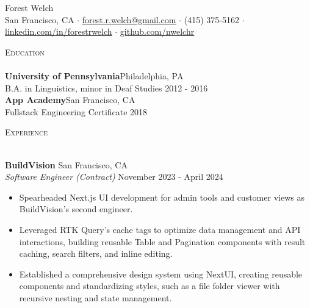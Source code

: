 \documentclass[a4paper]{article}
\newcommand{\header} [1] {
    {\hspace*{-18pt}\vspace*{3pt} \textcolor{deeppurple}{\textsc{#1}}}
    \vspace*{-12pt} \\
    \hspace*{-18pt} \textcolor{deeppurple}{\hrulefill} \\
}
\begin{document}
\vspace{-40pt}

\begin{center}
    {\fontsize{36}{36}\selectfont \textcolor{deeppurple}{Forest Welch}} \\ %
    \vspace{10pt} %
    \small San Francisco, CA $\cdot$ \href{mailto:forest.r.welch@gmail.com}{\underline{forest.r.welch@gmail.com}} $\cdot$ (415) 375-5162 $\cdot$ \href{https://linkedin.com/in/forestrwelch}{\underline{linkedin.com/in/forestrwelch}} $\cdot$ \href{https://github.com/nwelchr}{\underline{github.com/nwelchr}} %
\end{center}

\header{Education}
\textbf{University of Pennsylvania}\hfill Philadelphia, PA\\
B.A. in Linguistics, minor in Deaf Studies \hfill 2012 - 2016\\
\vspace{2mm}
\textbf{App Academy}\hfill San Francisco, CA\\
Fullstack Engineering Certificate \hfill 2018\\
\vspace{2mm}

\header{Experience}
\vspace{1mm}

\textbf{BuildVision} \hfill San Francisco, CA\\
\textit{Software Engineer (Contract)} \hfill November 2023 - April 2024\\
\vspace{-1mm}
\begin{itemize} \itemsep .5pt
    \item Spearheaded Next.js UI development for admin tools and customer views as BuildVision's second engineer.
    \item Leveraged RTK Query's cache tags to optimize data management and API interactions, building reusable Table and Pagination components with result caching, search filters, and inline editing.
    \item Established a comprehensive design system using NextUI, creating reusable components and standardizing styles, such as a file folder viewer with recursive nesting and state management.
\end{itemize}
\end{document}

